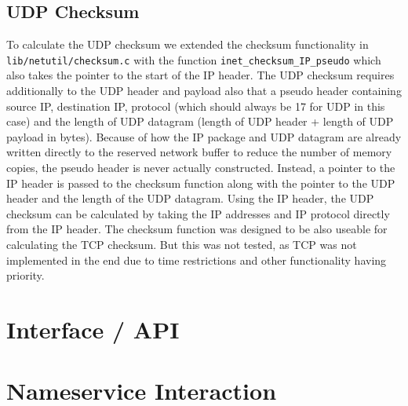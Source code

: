 \subsection{UDP Checksum}
To calculate the UDP checksum we extended the checksum functionality in \verb|lib/netutil/checksum.c| with the function \verb|inet_checksum_IP_pseudo| which also takes the pointer to the start of the IP header. The UDP checksum requires additionally to the UDP header and payload also that a pseudo header containing source IP, destination IP, protocol (which should always be 17 for UDP in this case) and the length of UDP datagram (length of UDP header + length of UDP payload in bytes).
Because of how the IP package and UDP datagram are already written directly to the reserved network buffer to reduce the number of memory copies, the pseudo header is never actually constructed. Instead, a pointer to the IP header is passed to the checksum function along with the pointer to the UDP header and the length of the UDP datagram. Using the IP header, the UDP checksum can be calculated by taking the IP addresses and IP protocol directly from the IP header.
The checksum function was designed to be also useable for calculating the TCP checksum. But this was not tested, as TCP was not implemented in the end due to time restrictions and other functionality having priority.

\section{Interface / API}

\section{Nameservice Interaction}
